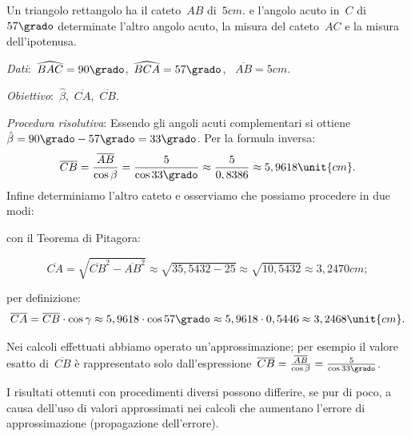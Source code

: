  \begin{esempio}
Un triangolo rettangolo ha il cateto~\(AB\) di~\(5\unit{cm}\). e l'angolo acuto 
in~\(C\) di~\(57\grado\) determinate l'altro angolo acuto,
la misura del cateto~\(AC\) e la misura dell'ipotenusa.

\emph{Dati}:~\(\widehat{BAC}=90\grado\),\quad~\(\widehat{BCA}=57\grado\),
\quad~\(\overline{AB}=5\unit{cm}\).

\emph{Obiettivo}:~\(\hat{\beta}\),\quad~\(\overline{CA}\),\quad~\(\overline{CB}\).

\emph{Procedura risolutiva}:
Essendo gli angoli acuti complementari si 
ottiene~\(\hat{\beta}=90\grado-57\grado=33\grado\).
Per la formula inversa:
\[\overline{CB}=\frac{\overline{AB}}{\cos 
\beta}=\frac{5}{\cos 33\grado} 
\approx\frac{5}{0,8386}\approx5,9618\unit{cm}.\]
Infine determiniamo l'altro cateto e osserviamo che possiamo procedere in due 
modi:
\begin{itemize*}
 \item con il Teorema di Pitagora:
 
\[\overline{CA}=\sqrt{\overline{CB}^{2}-\overline{AB}^{2}}\approx\sqrt{35,
5432-25}\approx\sqrt{10,5432}\approx3,2470\unit{cm};\]
 \item per definizione:
 \[\overline{CA}=\overline{CB}\cdot \cos \gamma\approx5,9618 \cdot 
\cos 57\grado \approx5,9618\cdot 0,5446\approx3,2468\unit{cm}.\]
\end{itemize*}
\osservazione
\begin{enumeratea}
\item Nei calcoli effettuati abbiamo operato un'approssimazione; per esempio 
il 
valore esatto di~\(\overline{CB}\) è rappresentato solo
dall'espressione~\(\overline{CB}=\frac{\overline{AB}}{\cos 
\beta}=\frac{5}{\cos 33\grado}\).
\item I risultati ottenuti con procedimenti diversi possono differire, se pur 
di 
poco, a causa dell'uso di valori approssimati
nei calcoli che aumentano l'errore di approssimazione (propagazione 
dell'errore).
\end{enumeratea}
 \end{esempio}

